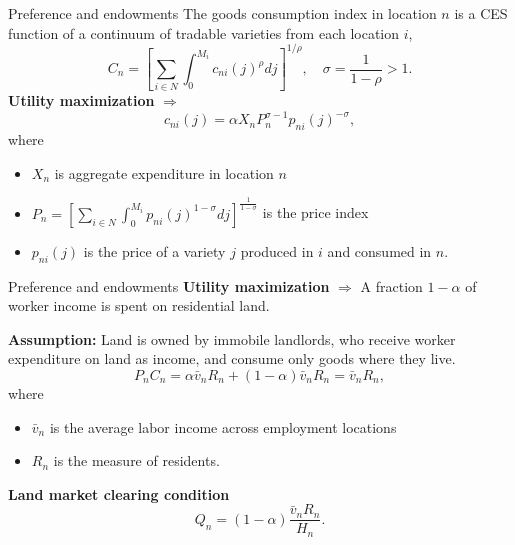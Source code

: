 \documentclass{beamer}
\begin{document}
\begin{frame}{Preference and endowments}
	The goods consumption index in location $n$ is a CES function of a continuum of tradable varieties from each location $i$,
	\begin{equation}
		C_n = \left[\sum_{i\in N}\int_0^{M_i}c_{ni}(j)^\rho dj \right]^{1/\rho},\quad \sigma=\frac{1}{1-\rho}>1.
	\end{equation}
	\textbf{Utility maximization} $\Rightarrow$
	\begin{equation}
		c_{ni}(j)=\alpha X_nP_n^{\sigma-1}p_{ni}(j)^{-\sigma},
	\end{equation}
	where
	\begin{itemize}
		\item $X_n$ is aggregate expenditure in location $n$
		\item $P_n=\left[\sum_{i\in N}\int_0^{M_i}p_{ni}(j)^{1-\sigma} dj\right]^{\frac{1}{1-\sigma}}$ is the price index
		\item $p_{ni}(j)$ is the price of a variety $j$ produced in $i$ and consumed in $n$.
	\end{itemize}
\end{frame}
\begin{frame}{Preference and endowments}
	\textbf{Utility maximization} $\Rightarrow$ A fraction $1-\alpha$ of worker income is spent on residential land.
	\medskip

	\textbf{Assumption:} Land is owned by immobile landlords, who receive worker expenditure on land as income, and consume only goods where they live.
	\begin{equation}
		P_nC_n = \alpha \bar{v}_nR_n + (1-\alpha)\bar{v}_nR_n = \bar{v}_nR_n,
	\end{equation}
	where
	\begin{itemize}
		\item $\bar{v}_n$ is the average labor income across employment locations
		\item $R_n$ is the measure of residents.
	\end{itemize}
	\medskip
	\textbf{Land market clearing condition}
	\begin{equation}
		Q_n = (1-\alpha)\frac{\bar{v}_nR_n}{H_n}.
	\end{equation}
\end{frame}
\end{document}
